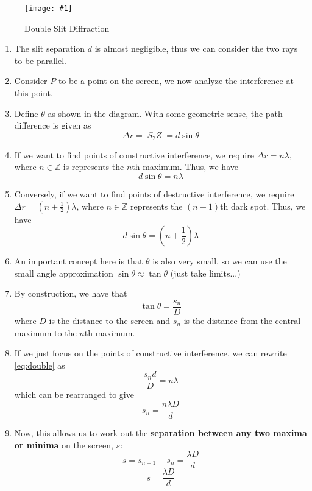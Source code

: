 \documentclass[a4paper,12pt]{article}
\newcommand{\img}[4]{\begin{center}
  \begin{figure}[H]
    \centering
    \texttt{[image: \#1]}
    \caption{#3}
    \label{fig:#4}
  \end{figure}
\end{center}}
\begin{document}
\img{doubleslit.png}{0.46}{Double Slit Diffraction}{doubleslit}
\begin{enumerate}
  \item The slit separation $d$ is almost negligible, thus we can consider the two rays to be parallel.
  \item Consider $P$ to be a point on the screen, we now analyze the interference at this point.
  \item Define $\theta$ as shown in the diagram. With some geometric sense, the path difference is given as
        $$\Delta r = |S_2Z| = d\sin\theta$$
  \item If we want to find points of constructive interference, we require $\Delta r = n\lambda$, where $n \in \mathbb{Z}$ is represents the $n$th maximum. Thus, we have
        \begin{equation}\label{eq:double}
          d\sin\theta = n\lambda
        \end{equation}
  \item Conversely, if we want to find points of destructive interference, we require $\Delta r = (n + \frac{1}{2})\lambda$, where $n \in \mathbb{Z}$ represents the $(n-1)$th dark spot. Thus, we have
        \begin{equation}\label{eq:double2}
          d\sin\theta = (n + \frac{1}{2})\lambda
        \end{equation}
  \item An important concept here is that $\theta$ is also very small, so we can use the small angle approximation $\sin\theta \approx \tan\theta$ (just take limits...)
  \item By construction, we have that $$\tan\theta = \frac{s_n}{D}$$
        where $D$ is the distance to the screen and $s_n$ is the distance from the central maximum to the $n$th maximum.
  \item If we just focus on the points of constructive interference, we can rewrite \cref{eq:double} as
        $$\frac{s_nd}{D} = n\lambda$$
        which can be rearranged to give
        \begin{equation}\label{eq:double3}
          s_n = \frac{n\lambda D}{d}
        \end{equation}
  \item Now, this allows us to work out the \textbf{separation between any two maxima or minima} on the screen, $s$:
        $$s = s_{n + 1} - s_n = \frac{\lambda D}{d}$$
        \begin{equation}
          s = \frac{\lambda D}{d}
        \end{equation}

\end{enumerate}
\end{document}
